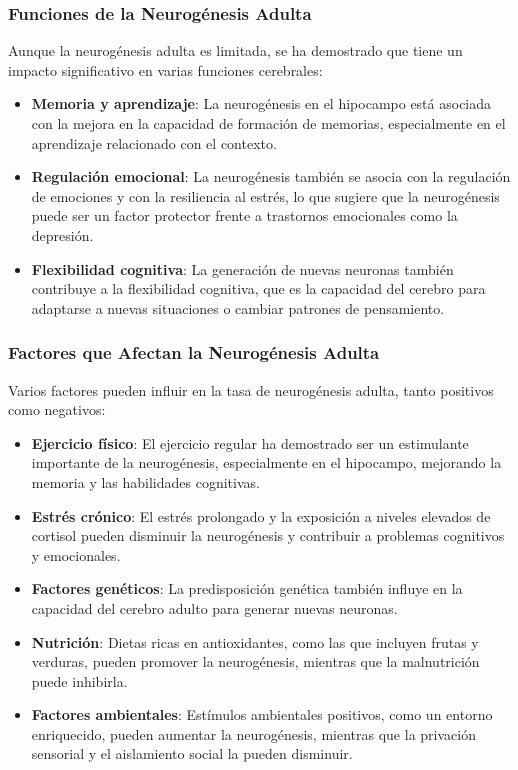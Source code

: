 \documentclass[12pt, letterpaper]{article}
\begin{document}
\subsubsection{Funciones de la Neurogénesis Adulta}
Aunque la neurogénesis adulta es limitada, se ha demostrado que tiene un impacto significativo en varias funciones cerebrales:

\begin{itemize}
    \item \textbf{Memoria y aprendizaje}: La neurogénesis en el hipocampo está asociada con la mejora en la capacidad de formación de memorias, especialmente en el aprendizaje relacionado con el contexto.
    \item \textbf{Regulación emocional}: La neurogénesis también se asocia con la regulación de emociones y con la resiliencia al estrés, lo que sugiere que la neurogénesis puede ser un factor protector frente a trastornos emocionales como la depresión.
    \item \textbf{Flexibilidad cognitiva}: La generación de nuevas neuronas también contribuye a la flexibilidad cognitiva, que es la capacidad del cerebro para adaptarse a nuevas situaciones o cambiar patrones de pensamiento.
\end{itemize}

\subsubsection{Factores que Afectan la Neurogénesis Adulta}
Varios factores pueden influir en la tasa de neurogénesis adulta, tanto positivos como negativos:

\begin{itemize}
    \item \textbf{Ejercicio físico}: El ejercicio regular ha demostrado ser un estimulante importante de la neurogénesis, especialmente en el hipocampo, mejorando la memoria y las habilidades cognitivas.
    \item \textbf{Estrés crónico}: El estrés prolongado y la exposición a niveles elevados de cortisol pueden disminuir la neurogénesis y contribuir a problemas cognitivos y emocionales.
    \item \textbf{Factores genéticos}: La predisposición genética también influye en la capacidad del cerebro adulto para generar nuevas neuronas.
    \item \textbf{Nutrición}: Dietas ricas en antioxidantes, como las que incluyen frutas y verduras, pueden promover la neurogénesis, mientras que la malnutrición puede inhibirla.
    \item \textbf{Factores ambientales}: Estímulos ambientales positivos, como un entorno enriquecido, pueden aumentar la neurogénesis, mientras que la privación sensorial y el aislamiento social la pueden disminuir.
\end{itemize}
\end{document}
